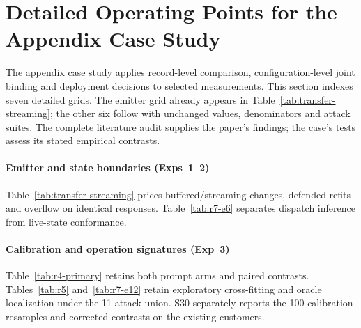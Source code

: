 \section{Detailed Operating Points for the Appendix Case Study}\label{sec:synthesis-study-details}
The appendix case study applies record-level comparison, configuration-level joint binding and deployment decisions to selected measurements. This section indexes seven detailed grids. The emitter grid already appears in Table~\ref{tab:transfer-streaming}; the other six follow with unchanged values, denominators and attack suites. The complete literature audit supplies the paper's findings; the case's tests assess its stated empirical contrasts.

\begingroup\makeatletter
\renewenvironment{table}[1][]{\par\medskip\noindent\begin{minipage}{\textwidth}\def\@captype{table}\centering}{\end{minipage}\par\medskip}
\renewenvironment{table*}[1][]{\par\medskip\noindent\begin{minipage}{\textwidth}\def\@captype{table}\centering}{\end{minipage}\par\medskip}
\makeatother

\paragraph{Emitter and state boundaries (Exps~1--2)}
Table~\ref{tab:transfer-streaming} prices buffered/streaming changes, defended refits and overflow on identical responses. Table~\ref{tab:r7-e6} separates dispatch inference from live-state conformance.


\paragraph{Calibration and operation signatures (Exp~3)}
Table~\ref{tab:r4-primary} retains both prompt arms and paired contrasts. Tables~\ref{tab:r5} and~\ref{tab:r7-e12} retain exploratory cross-fitting and oracle localization under the 11-attack union. S30 separately reports the 100 calibration resamples and corrected contrasts on the existing customers.




